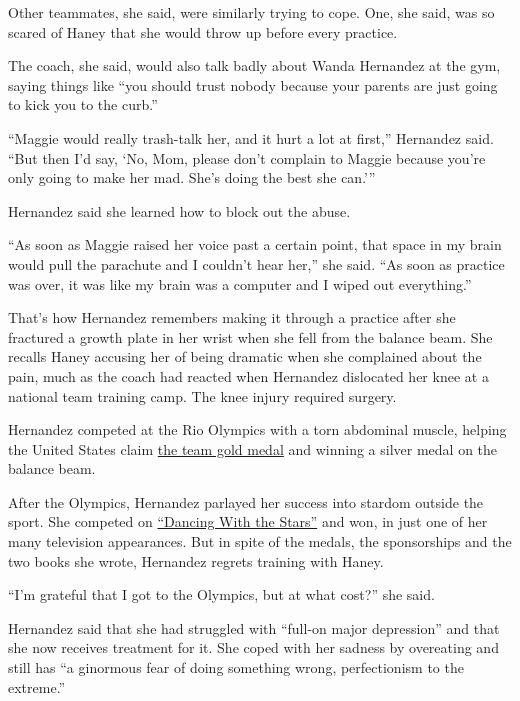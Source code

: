 Other teammates, she said, were similarly trying to cope. One, she said,
was so scared of Haney that she would throw up before every practice.

The coach, she said, would also talk badly about Wanda Hernandez at the
gym, saying things like ``you should trust nobody because your parents
are just going to kick you to the curb.''

``Maggie would really trash-talk her, and it hurt a lot at first,''
Hernandez said. ``But then I'd say, `No, Mom, please don't complain to
Maggie because you're only going to make her mad. She's doing the best
she can.'''

Hernandez said she learned how to block out the abuse.

``As soon as Maggie raised her voice past a certain point, that space in
my brain would pull the parachute and I couldn't hear her,'' she said.
``As soon as practice was over, it was like my brain was a computer and
I wiped out everything.''

That's how Hernandez remembers making it through a practice after she
fractured a growth plate in her wrist when she fell from the balance
beam. She recalls Haney accusing her of being dramatic when she
complained about the pain, much as the coach had reacted when Hernandez
dislocated her knee at a national team training camp. The knee injury
required surgery.

Hernandez competed at the Rio Olympics with a torn abdominal muscle,
helping the United States claim
\href{https://www.nytimes.com/interactive/2016/08/09/sports/olympics-womens-gymnastics-team-all-around.html}{the
team gold medal} and winning a silver medal on the balance beam.

After the Olympics, Hernandez parlayed her success into stardom outside
the sport. She competed on
\href{https://www.nj.com/entertainment/celebrities/2016/11/laurie_hernandez_dancing_with_the_stars_ranked.html}{``Dancing
With the Stars''} and won, in just one of her many television
appearances. But in spite of the medals, the sponsorships and the two
books she wrote, Hernandez regrets training with Haney.

``I'm grateful that I got to the Olympics, but at what cost?'' she said.

Hernandez said that she had struggled with ``full-on major depression''
and that she now receives treatment for it. She coped with her sadness
by overeating and still has ``a ginormous fear of doing something wrong,
perfectionism to the extreme.''

